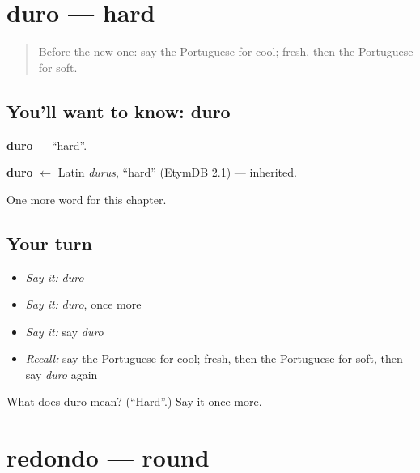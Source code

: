\section[duro]{duro — hard}

\label{lesson:PT-C126-duro}



\begin{quote}
Before the new one: say the Portuguese for cool; fresh, then the Portuguese for soft.
\end{quote}

\subsection*{You'll want to know: duro}
\textbf{duro} — \textquotedblleft{}hard\textquotedblright{}.

\begin{cousinweb}
\textbf{duro} $\leftarrow$ Latin \emph{durus}, \textquotedblleft{}hard\textquotedblright{} (EtymDB 2.1) — inherited.
\end{cousinweb}

\begin{grammarlens}[title={What you've built}]
One more word for this chapter.
\end{grammarlens}

\subsection*{Your turn}
\begin{itemize}
\raggedright
  \item \emph{Say it:} \emph{duro}
  \item \emph{Say it:} \emph{duro}, once more
  \item \emph{Say it:} say \emph{duro}
  \item \emph{Recall:} say the Portuguese for cool; fresh, then the Portuguese for soft, then say \emph{duro} again
\end{itemize}

\begin{tcolorbox}[breakable,colback=teal!4,colframe=teal!35!black,title={Before you move on}]
What does duro mean? (\textquotedblleft{}Hard\textquotedblright{}.) Say it once more.
\end{tcolorbox}
\section[redondo]{redondo — round}

